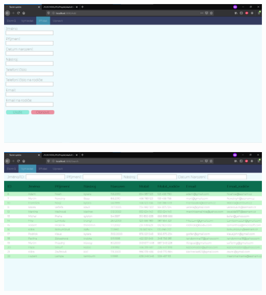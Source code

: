 \documentclass[a4paper, 11pt, twocolumn]{article}
\begin{document}
	\par\vspace*{0.4cm}
	\begin{center}
	\includegraphics[width=1\textwidth]{administ_add.png}
	\end{center}
	\vspace*{\fill}
	\begin{center}
	\includegraphics[width=1\textwidth]{administ_search.png}
	\end{center}


	\vspace*{\fill}
	\clearpage
\end{document}
